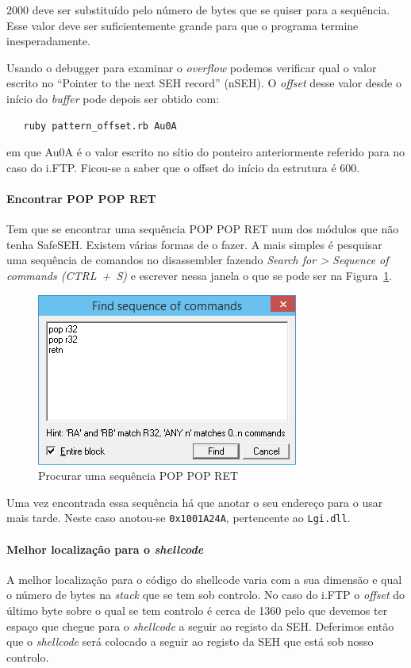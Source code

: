 \documentclass[11pt,a4paper]{article}
\begin{document}
2000 deve ser substituído pelo número de bytes que se quiser para a sequência. Esse valor deve ser suficientemente grande para que o programa termine inesperadamente.

Usando o debugger para examinar o \textit{overflow} podemos verificar qual o valor escrito no ``Pointer to the next SEH record'' (nSEH). O \textit{offset} desse valor desde o início do \textit{buffer} pode depois ser obtido com:

\begin{lstlisting}
   ruby pattern_offset.rb Au0A
\end{lstlisting}


em que Au0A é o valor escrito no sítio do ponteiro anteriormente referido para no caso do i.FTP. Ficou-se a saber que o offset do início da estrutura é 600.

\paragraph*{Encontrar POP POP RET} Tem que se encontrar uma sequência POP POP RET num dos módulos que não tenha SafeSEH. Existem várias formas de o fazer. A mais simples é pesquisar uma sequência de comandos no disassembler fazendo \textit{Search for > Sequence of commands (CTRL~+~S)} e escrever nessa janela o que se pode ser na Figura~\ref{find_POPPOPRET}.

\begin{figure}
	\centering
	\includegraphics[scale=1]{find_POPPOPRET}
	\caption{Procurar uma sequência POP POP RET}
	\label{find_POPPOPRET}
\end{figure}

Uma vez encontrada essa sequência há que anotar o seu endereço para o usar mais tarde. Neste caso anotou-se \texttt{0x1001A24A}, pertencente ao \texttt{Lgi.dll}.

\paragraph*{Melhor localização para o \textit{shellcode}} A melhor localização para o código do shellcode varia com a sua dimensão e qual o número de bytes na \textit{stack} que se tem sob controlo. No caso do i.FTP o \textit{offset} do último byte sobre o qual se tem controlo é cerca de 1360 pelo que devemos ter espaço que chegue para o \textit{shellcode} a seguir ao registo da SEH. Deferimos então que o \textit{shellcode} será colocado a seguir ao registo da SEH que está sob nosso controlo.
\end{document}
